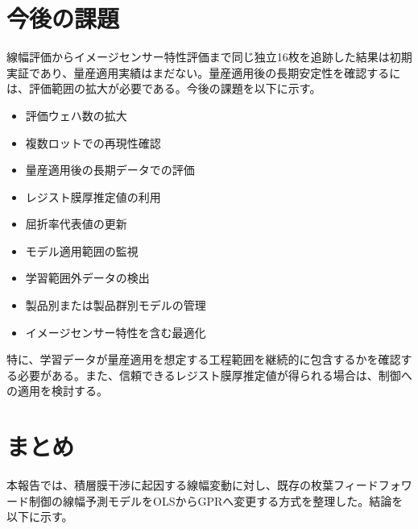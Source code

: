 \documentclass[11pt,a4paper]{ltjsarticle}
\begin{document}
\section{今後の課題}
\label{sec:future-work}

線幅評価からイメージセンサー特性評価まで同じ独立16枚を追跡した結果は初期実証であり、量産適用実績はまだない。量産適用後の長期安定性を確認するには、評価範囲の拡大が必要である。今後の課題を以下に示す。

\begin{itemize}
  \item 評価ウェハ数の拡大
  \item 複数ロットでの再現性確認
  \item 量産適用後の長期データでの評価
  \item レジスト膜厚推定値の利用
  \item 屈折率代表値の更新
  \item モデル適用範囲の監視
  \item 学習範囲外データの検出
  \item 製品別または製品群別モデルの管理
  \item イメージセンサー特性を含む最適化
\end{itemize}

特に、学習データが量産適用を想定する工程範囲を継続的に包含するかを確認する必要がある。また、信頼できるレジスト膜厚推定値が得られる場合は、制御への適用を検討する。


\clearpage
\section{まとめ}
\label{sec:conclusion}

本報告では、積層膜干渉に起因する線幅変動に対し、既存の枚葉フィードフォワード制御の線幅予測モデルをOLSからGPRへ変更する方式を整理した。結論を以下に示す。
\end{document}
